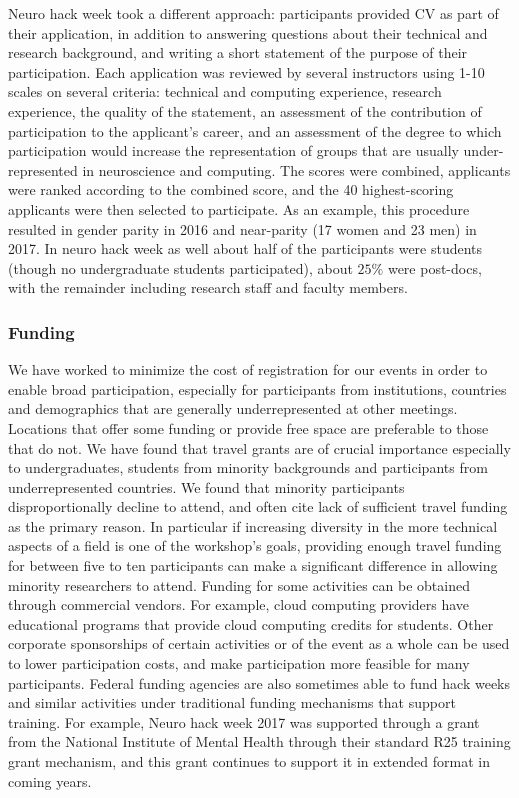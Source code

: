 Neuro hack week took a different approach: participants provided CV as part of their application, in addition to answering questions about their technical and research background, and writing a short statement of the purpose of their participation. Each application was reviewed by several instructors using 1-10 scales on several criteria: technical and computing experience, research experience, the quality of the statement, an assessment of the contribution of participation to the applicant's career, and an assessment of the degree to which participation would increase the representation of groups that are usually under-represented in neuroscience and computing. The scores were combined, applicants were ranked according to the combined score, and the 40 highest-scoring applicants were then selected to participate. As an example,  this procedure resulted in gender parity in 2016 and near-parity (17 women and 23 men) in 2017. In neuro hack week as well about half of the participants were students (though no undergraduate students participated), about $25\%$ were post-docs, with the remainder including research staff and faculty members.

\subsubsection{Funding}

We have worked to minimize the cost of registration for our events in order to enable broad participation, especially for participants from institutions, countries and demographics that are generally underrepresented at other meetings. Locations that offer some funding or provide free space are preferable to those that do not.
We have found that travel grants are of crucial importance especially to undergraduates, students from minority backgrounds and participants from underrepresented countries. We found that minority participants disproportionally decline to attend, and often cite lack of sufficient travel funding as the primary reason. In particular if increasing diversity in the more technical aspects of a field is one of the workshop's goals, providing enough travel funding for between five to ten participants can make a significant difference in allowing minority researchers to attend.
Funding for some activities can be obtained through commercial vendors.
For example, cloud computing providers have educational programs that provide cloud computing credits for students.
Other corporate sponsorships of certain activities or of the event as a whole can be used to lower participation costs, and make participation more feasible for many participants.
Federal funding agencies are also sometimes able to fund hack weeks and similar activities under traditional funding mechanisms that support training. For example, Neuro hack week 2017 was supported through a grant from the National Institute of Mental Health through their standard R25 training grant mechanism, and this grant continues to support it in extended format in coming years.

